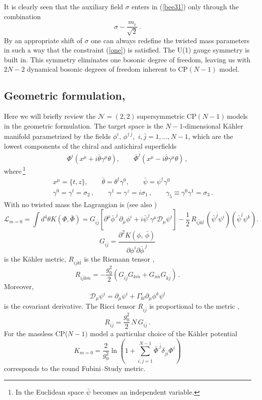 \documentclass[epsfig,12pt]{article}
\def\beq{\begin{equation}}
\def\eeq{\end{equation}}
\def\beqn{\begin{eqnarray}}
\def\eeqn{\end{eqnarray}}
\newcommand{\ntt}{${\mathcal N}=(2,2)\,$}
\newcommand{\cpn}{CP$(N-1)\,$}
\newcommand{\cell}{{\mathcal L}}
\newcommand{\cde}{{\mathcal D}}
\def\beqn{\begin{eqnarray}}
\def\eeqn{\end{eqnarray}}
\def\beq{\begin{equation}}
\def\eeq{\end{equation}}
\begin{document}
It is clearly seen that the auxiliary field $\sigma$
enters in (\ref{bee31}) only through the  combination
\beq
\sigma -\frac{m_i}{\sqrt 2}\,.
\label{combi}
\eeq
By an appropriate shift of $\sigma$
one can always redefine the twisted mass parameters in such a way that the constraint
(\ref{one}) is satisfied.
The U(1) gauge symmetry is built in. This symmetry eliminates one bosonic degree of freedom, leaving us with $2N-2$ dynamical bosonic degrees of freedom inherent to CP$(N-1)$ model.



\subsection{Geometric formulation,  }

Here we will  briefly review the \ntt supersymmetric \cpn models in the
geometric formulation. 
The target space is the $N-1$-dimensional K\"ahler manifold 
parametrized by the fields $\phi^{i},\,\phi^{\dagger\,\bar j}$, $\,i,\bar j=1,\ldots,N-1$,
which are the lowest components of the chiral and antichiral superfields 
\beq
\Phi^{i}(x^{\mu}+i\bar \theta \gamma^{\mu} \theta),\qquad \bar\Phi^{\bar j}(x^{\mu}-i\bar \theta \gamma^{\mu} \theta)\,,
\label{wtpi4}
\eeq
where\,\footnote{In the Euclidean space $\bar\psi$ becomes an independent variable.}
\beqn
&&
x^{\mu}=\{t,z\},\qquad \bar \theta=\theta^{\dagger}\gamma^{0},\qquad \bar \psi=\psi^{\dagger}\gamma^{0}
\nonumber
\\[2mm]
&&\gamma^{0}=\gamma^t=\sigma_2\,,\qquad \gamma^{1}=\gamma^z = i\sigma_1\,,\qquad \gamma_{5} 
\equiv\gamma^0\gamma^1 = \sigma_3\,.
\label{wtpi5}
\eeqn
With no twisted mass the Lagrangian  is \cite{Bruno}
(see also \cite{WessBagger})
\begin{equation}
\label{eq:kinetic}
{\cell}_{m=0}= \int d^{4 }\theta K(\Phi, \bar\Phi)
=G_{i\bar j} \left[\partial^\mu \bar\phi^{\,\bar j}\, \partial_\mu\phi^{i}
+i\bar \psi^{\bar j} \gamma^{\mu} \cde_{\mu}\psi^{i}\right]
-\frac{1}{2}\,R_{i\bar jk\bar l}\,(\bar\psi^{\bar j}\psi^{i})(\bar\psi^{\bar l}\psi^{k}).
\end{equation}
\beq
G_{i\bar j}=\frac{\partial^{2} K(\phi,\,\bar\phi)}{\partial \phi^{i}\partial \bar\phi^{\,\bar j}}
\label{wtpi6}
\eeq
 is the K\"ahler metric,
$R_{i\bar jk\bar l}$ is the Riemann tensor \cite{Helgason}, 
\beq
R_{i\bar{j} k\bar{m}} = - \frac{g_0^2}{2}\left(G_{i\bar{j}}G_{k\bar{m}} +
G_{i\bar{m}}G_{k\bar{j}}
\right)\,.
\label{640}
\eeq
Moreover,
$$ \cde_{\mu}\psi^{i}=
\partial_{\mu}\psi^{i}+\Gamma^{i}_{kl}\partial_{\mu} \phi^{k}\psi^{l}
$$
is the covariant derivative.
The Ricci tensor $R_{i\bar j}$ is proportional to the metric \cite{Helgason},
\beq
\label{eq:RG}
R_{i\bar{j}} = \frac{g_{0}^2}{2}\,  N \, G_{i\bar{j}}\,.
\eeq
For the massless CP($N\!-\!1)$ model 
a particular choice of the K\"ahler potential
\begin{equation}
\label{eq:kahler}
K_{m=0}=\frac{2}{g_{0}^{2}}\ln\left(1+\sum_{i,\bar j=1}^{ N-1}\bar\Phi^{\,\bar j}\delta_{\bar j i}\Phi^{i}\right)
\end{equation}
corresponds to the round Fubini--Study metric.
\end{document}
